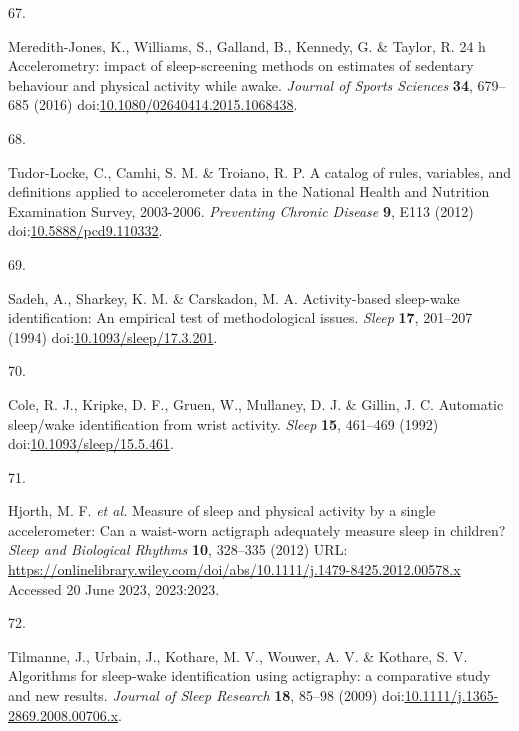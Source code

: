 \documentclass[
  10pt,
]{scrbook}
\newlength{\cslhangindent}
\newlength{\csllabelwidth}
\newlength{\cslentryspacingunit} %
\newenvironment{CSLReferences}[2] %
 {%
  \setlength{\parindent}{0pt}
  \ifodd #1
  \let\oldpar\par
  \def\par{\hangindent=\cslhangindent\oldpar}
  \fi
  \setlength{\parskip}{#2\cslentryspacingunit}
 }%
 {}
\newcommand{\CSLLeftMargin}[1]{\parbox[t]{\csllabelwidth}{#1}}
\newcommand{\CSLRightInline}[1]{\parbox[t]{\linewidth - \csllabelwidth}{#1}\break}
\begin{document}
\begin{CSLReferences}{0}{0}
\leavevmode{}%
\CSLLeftMargin{67. }%
\CSLRightInline{Meredith-Jones, K., Williams, S., Galland, B., Kennedy,
G. \& Taylor, R. 24 h Accelerometry: impact of sleep-screening methods
on estimates of sedentary behaviour and physical activity while awake.
\emph{Journal of Sports Sciences} \textbf{34}, 679--685 (2016)
doi:\href{https://doi.org/10.1080/02640414.2015.1068438}{10.1080/02640414.2015.1068438}.}

\leavevmode{}%
\CSLLeftMargin{68. }%
\CSLRightInline{Tudor-Locke, C., Camhi, S. M. \& Troiano, R. P. A
catalog of rules, variables, and definitions applied to accelerometer
data in the National Health and Nutrition Examination Survey, 2003-2006.
\emph{Preventing Chronic Disease} \textbf{9}, E113 (2012)
doi:\href{https://doi.org/10.5888/pcd9.110332}{10.5888/pcd9.110332}.}

\leavevmode{}%
\CSLLeftMargin{69. }%
\CSLRightInline{Sadeh, A., Sharkey, K. M. \& Carskadon, M. A.
Activity-based sleep-wake identification: An empirical test of
methodological issues. \emph{Sleep} \textbf{17}, 201--207 (1994)
doi:\href{https://doi.org/10.1093/sleep/17.3.201}{10.1093/sleep/17.3.201}.}

\leavevmode{}%
\CSLLeftMargin{70. }%
\CSLRightInline{Cole, R. J., Kripke, D. F., Gruen, W., Mullaney, D. J.
\& Gillin, J. C. Automatic sleep/wake identification from wrist
activity. \emph{Sleep} \textbf{15}, 461--469 (1992)
doi:\href{https://doi.org/10.1093/sleep/15.5.461}{10.1093/sleep/15.5.461}.}

\leavevmode{}%
\CSLLeftMargin{71. }%
\CSLRightInline{Hjorth, M. F. \emph{et al.} Measure of sleep and
physical activity by a single accelerometer: Can a waist-worn actigraph
adequately measure sleep in children? \emph{Sleep and Biological
Rhythms} \textbf{10}, 328--335 (2012) URL:
\url{https://onlinelibrary.wiley.com/doi/abs/10.1111/j.1479-8425.2012.00578.x}
Accessed 20 June 2023, 2023:2023.}

\leavevmode{}%
\CSLLeftMargin{72. }%
\CSLRightInline{Tilmanne, J., Urbain, J., Kothare, M. V., Wouwer, A. V.
\& Kothare, S. V. Algorithms for sleep-wake identification using
actigraphy: a comparative study and new results. \emph{Journal of Sleep
Research} \textbf{18}, 85--98 (2009)
doi:\href{https://doi.org/10.1111/j.1365-2869.2008.00706.x}{10.1111/j.1365-2869.2008.00706.x}.}


\end{CSLReferences}
\end{document}
